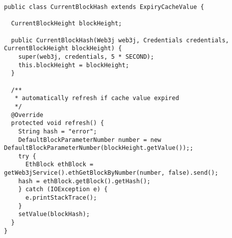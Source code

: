 \begin{lstlisting}[basicstyle=\small]
public class CurrentBlockHash extends ExpiryCacheValue {

  CurrentBlockHeight blockHeight;

  public CurrentBlockHash(Web3j web3j, Credentials credentials, CurrentBlockHeight blockHeight) {
    super(web3j, credentials, 5 * SECOND);
    this.blockHeight = blockHeight;
  }

  /**
   * automatically refresh if cache value expired
   */
  @Override
  protected void refresh() {
    String hash = "error";
    DefaultBlockParameterNumber number = new DefaultBlockParameterNumber(blockHeight.getValue());;
    try {
      EthBlock ethBlock = getWeb3jService().ethGetBlockByNumber(number, false).send();
    hash = ethBlock.getBlock().getHash();
    } catch (IOException e) {
      e.printStackTrace();
    }
    setValue(blockHash);
  }
}
\end{lstlisting}

